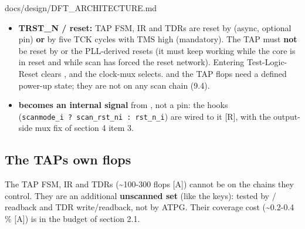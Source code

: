 \begin{relocated}{docs/design/DFT_ARCHITECTURE.md}
\begin{itemize}
{  , , , ,
  ) are NOT synchronised and there is no such wait
  rule}; they cross unsynchronised by design under the quasi-static
  tester contract, with the reasons in section 15.5 crossing 2 (the
  original plan listed  for the reset overrides here;
  that was superseded by Stage 1b). \textbf{Status crossings back}
  (, ) are sticky and sampled at 
  through 2-FF synchronisers (also Stage 4 plan). The
  repo\textquotesingle s existing primitives (,
   {[}R{]}) are reused; the SDC needs
  \texttt{set\_\allowbreak{}clock\_\allowbreak{}groups\ -\allowbreak{}asynchronous}
  for TCK and
  \texttt{set\_\allowbreak{}max\_\allowbreak{}delay\ -\allowbreak{}datapath\_\allowbreak{}only}
  on these crossings, following  {[}R:
  item 12 of CLAUDE.md{]}.
\item
  \textbf{TRST\_N / reset:} TAP FSM, IR and TDRs are reset by
   (async, optional pin) \textbf{or} by five TCK cycles
  with TMS high (mandatory). The TAP must \textbf{not} be reset by
   or the PLL-derived resets (it must keep working while
  the core is in reset and while scan has forced the reset network).
  Entering Test-Logic-Reset clears ,  and
  the clock-mux selects.  and the TAP flops need a defined
  power-up state; they are not on any scan chain (9.4).
\item
  \textbf{ becomes an internal signal} from
  , not a pin: the  hooks
  (\texttt{scanmode\_\allowbreak{}i\ ?\ scan\_\allowbreak{}rst\_\allowbreak{}ni\ :\allowbreak{}\ rst\_\allowbreak{}n\_\allowbreak{}i})
  are wired to it {[}R{]}, with the  output-side
  mux fix of section 4 item 3.
\end{itemize}

\subsection{The TAP\textquotesingle s own flops}\label{tm:ch:dft-architecture:94-the-taps-own-flops}

The TAP FSM, IR and TDRs (\textasciitilde100-300 flops {[}A{]}) cannot
be on the chains they control. They are an additional \textbf{unscanned
set} (like the keys): tested by / readback and
TDR write/\allowbreak{}readback, not by ATPG. Their coverage cost
(\textasciitilde0.2-0.4 \% {[}A{]}) is in the budget of section 2.1.


\end{relocated}
